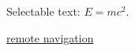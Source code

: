 \documentclass{article}
\begin{document}
Selectable text: $E = mc^2$.

\href{https://attacker.invalid/latex}{remote navigation}
\immediate{}

\end{document}
